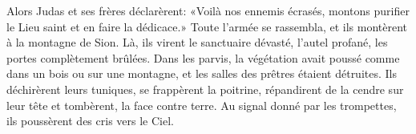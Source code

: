 Alors Judas et ses frères déclarèrent:
	«Voilà nos ennemis écrasés, montons purifier le Lieu saint et en faire la dédicace.»
Toute l’armée se rassembla, et ils montèrent à la montagne de Sion.
Là, ils virent le sanctuaire dévasté, l’autel profané, les portes complètement brûlées.
	Dans les parvis, la végétation avait poussé comme dans un bois ou sur une montagne,
	et les salles des prêtres étaient détruites.
Ils déchirèrent leurs tuniques, se frappèrent la poitrine,
	répandirent de la cendre sur leur tête et tombèrent, la face contre terre.
Au signal donné par les trompettes, ils poussèrent des cris vers le Ciel.
